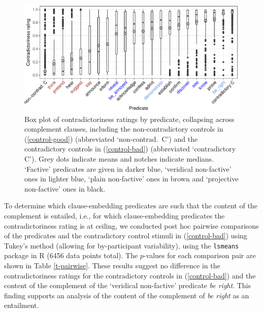 \documentclass[11pt,fleqn]{article}
\newcommand{\6}{\mbox{$[\hspace*{-.6mm}[$}}
\newcommand{\9}{\mbox{$]\hspace*{-.6mm}]$}}
\begin{document}
{%

\begin{figure}[h!]
\centering

\includegraphics[width=.75\paperwidth]{../results/2-veridicality2/graphs/boxplot-veridicality}

\caption{Box plot of contradictoriness ratings by predicate, collapsing across complement clauses, including the non-contradictory controls in (\ref{control-good}) (abbreviated `non-contrad.\ C') and the contradictory controls in (\ref{control-bad}) (abbreviated `contradictory C'). Grey dots indicate means and notches indicate medians. `Factive' predicates are given in darker blue, `veridical non-factive' ones in lighter blue, `plain non-factive' ones in brown and `projective non-factive' ones in black.}
\label{f-veridicality-predicate}
\end{figure}

To determine which clause-embedding predicates are such that the content of the complement is entailed, i.e., for which clause-embedding predicates the contradictoriness rating is  at ceiling, we conducted post hoc pairwise comparisons of the predicates and the contradictory control stimuli in (\ref{control-bad}) using Tukey's method (allowing for by-participant variability), using the \verb|lsmeans| package \citep{tukey} in R \citep{r}  (6456 data points total). The $p$-values for each comparison pair are shown in Table  \ref{t-pairwise}. These results suggest no difference in the contradictoriness ratings for the contradictory controls in (\ref{control-bad}) and the content of the complement of the `veridical non-factive' predicate {\em be right}. This finding supports an analysis of the content of the complement of {\em be right} as an entailment. 


}
\end{document}

